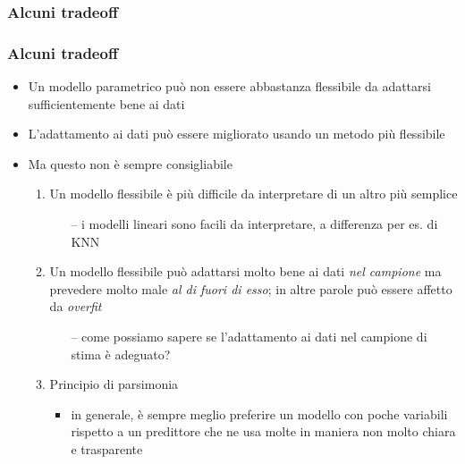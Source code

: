 {\begin{frame}

\end{frame}


\subsubsection[Alcuni tradeoff]{Alcuni tradeoff}

\begin{frame}
	\frametitle{Alcuni tradeoff}
	\begin{itemize}
		\item Un modello parametrico può non essere abbastanza flessibile da adattarsi sufficientemente bene ai dati
		\item L'adattamento ai dati può essere migliorato usando un metodo più flessibile
		\item Ma questo non è sempre consigliabile
			\begin{enumerate}
				\item Un modello flessibile è più difficile da interpretare di un altro più semplice
					\begin{itemize}
						\item[--] i modelli lineari sono facili da interpretare, a differenza per es. di KNN
					\end{itemize}
				\item Un modello flessibile può adattarsi molto bene ai dati \emph{nel campione} ma prevedere molto male \emph{al di fuori di esso}; in altre parole può essere affetto da \emph{overfit}
					\begin{itemize}
						\item[--] come possiamo sapere se l'adattamento ai dati nel campione di stima \`{e} adeguato?
					\end{itemize}
				\item Principio di parsimonia
					\begin{itemize}
						\item in generale, è sempre meglio preferire un modello con poche variabili rispetto a un predittore che ne usa molte in maniera non molto chiara e trasparente
					\end{itemize}
			\end{enumerate}
	\end{itemize}
\end{frame}


}
